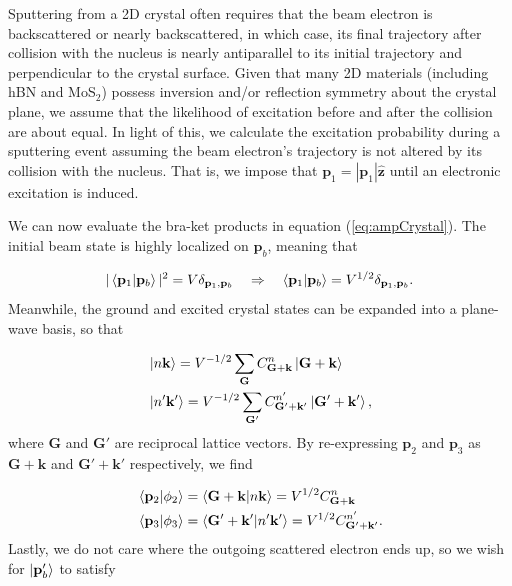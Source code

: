 \documentclass{article}
\begin{document}
Sputtering from a 2D crystal often requires that the beam electron is
backscattered or nearly backscattered, in which case, its final trajectory
after collision with the nucleus is nearly antiparallel to its initial
trajectory and perpendicular to the crystal surface.
Given that many 2D materials (including hBN and MoS$_2$) possess inversion
and/or reflection symmetry about the crystal plane, we assume that the
likelihood of excitation before and after the collision are about equal.
In light of this, we calculate the excitation probability during a sputtering event
assuming the beam electron's trajectory is not altered by its collision with
the nucleus.
That is, we impose that $\mathbf{p}_1 = |\mathbf{p}_1|\hat{\mathbf{z}}$ until
an electronic excitation is induced.

We can now evaluate the bra-ket products in equation (\ref{eq:ampCrystal}).
The initial beam state is highly localized on $\mathbf{p}_b$, meaning that

\begin{equation} 
  \label{eq:phi_1}
    |\bra{\mathbf{p}_1}\ket{\mathbf{p}_b}|^2
    =
    V\delta_{\mathbf{p}_1,\mathbf{p}_b} \quad\Rightarrow\quad
    \bra{\mathbf{p}_1}\ket{\mathbf{p}_b}
    =
    V^{1/2}\delta_{\mathbf{p}_1,\mathbf{p}_b}.
\end{equation}
%
Meanwhile, the ground and excited crystal states can be expanded into a
plane-wave basis, so that

\begin{equation} 
  \begin{aligned}
    &\ket{n\mathbf{k}}
    =
    V^{-1/2}\sum_{\mathbf{G}}
    C_{\mathbf{G+k}}^n \ket{\mathbf{G+k}} \\& \ket{n'\mathbf{k'}}
    =
    V^{-1/2}\sum_{\mathbf{G'}} C_{\mathbf{G'+k'}}^{n'} \ket{\mathbf{G'+k'}},
  \end{aligned}
\end{equation}
%
where $\mathbf{G}$ and $\mathbf{G'}$ are reciprocal lattice vectors.
By re-expressing $\mathbf{p}_2$ and $\mathbf{p}_3$ as $\mathbf{G+k}$ and
$\mathbf{G'+k'}$ respectively, we find

\begin{equation} 
  \label{eq:phi_2} 
  \begin{aligned}
    &\bra{\mathbf{p}_2}\ket{\phi_2}
    =
    \bra{\mathbf{G + k}}\ket{n\mathbf{k}}
    =
    V^{1/2}C^n_\mathbf{G+k}
    \\&
    \bra{\mathbf{p}_3}\ket{\phi_3}
    =
    \bra{\mathbf{G' + k'}}\ket{n'\mathbf{k'}}
    =
    V^{1/2}C^{n'}_\mathbf{G'+k'}.
  \end{aligned}
\end{equation}
%
Lastly, we do not care where the outgoing scattered electron ends up, so we
wish for $\ket{\mathbf{p}_b'}$ to satisfy
\end{document}
